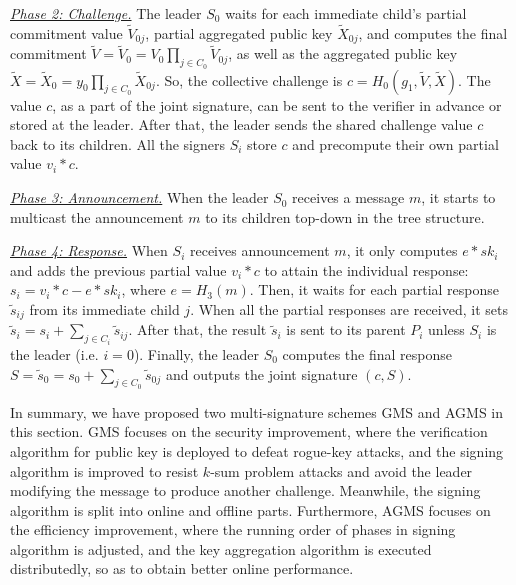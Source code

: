 \documentclass[journal]{IEEEtran}
\begin{document}
\noindent\emph{\underline{Phase 2: Challenge.}} The leader \(S_0\) waits for each immediate child's partial commitment value \(\tilde{V}_{0j}\), partial aggregated public key \(\tilde{X}_{0j}\), and computes the final commitment \(\tilde{V}=\tilde{V}_0={V}_0\prod_{j\in C_0}\tilde{V}_{0j}\), as well as the aggregated public key \(\tilde{X}= \tilde{X}_0=y_0\prod_{j\in C_0}{\tilde{X}_{0j}}\). So, the collective challenge is \(c= H_0(g_1,\tilde{V},\tilde{X})\). The value \(c\), as a part of the joint signature, can be sent to the verifier in advance or stored at the leader. After that, the leader sends the shared challenge value \(c\) back to its children. All the signers \(S_i\) store \(c\) and precompute their own partial value \(v_i *c\).

\noindent\emph{\underline{Phase 3: Announcement.}} When the leader \(S_0\) receives a message \(m\), it starts to multicast the announcement \(m\) to its children top-down in the tree structure.

\noindent\emph{\underline{Phase 4: Response.}} When \(S_i\) receives announcement \(m\), it only computes \(e*sk_i\) and adds the previous partial value \(v_i *c\) to attain the individual response: \(s_i=v_i*c-e*sk_i\), where \(e=H_3(m)\). Then, it waits for each partial response \(\tilde{s}_{ij}\) from its immediate child \(j\). When all the partial responses are received, it sets \(\tilde{s}_i= s_i+\sum_{j\in C_i}{\tilde{s}_{ij}}\). After that, the result \(\tilde{s}_i\) is sent to its parent \(P_i\) unless \(S_i\) is the leader (i.e. \(i=0\)). Finally, the leader \(S_0\) computes the final response \(S= \tilde{s}_0=s_0+\sum_{j\in C_0}{\tilde{s}_{0j}}\) and outputs the joint signature \((c,S)\).

In summary, we have proposed two multi-signature schemes GMS and AGMS in this section. GMS focuses on the security improvement, where the verification algorithm for public key is deployed to defeat rogue-key attacks, and the signing algorithm is improved to resist $k$-sum problem attacks and avoid the leader modifying the message to produce another challenge. Meanwhile, the signing algorithm is split into online and offline parts. Furthermore, AGMS focuses on the efficiency improvement, where the running order of phases in signing algorithm is adjusted, and the key aggregation algorithm is executed distributedly, so as to obtain better online performance.

\end{document}
